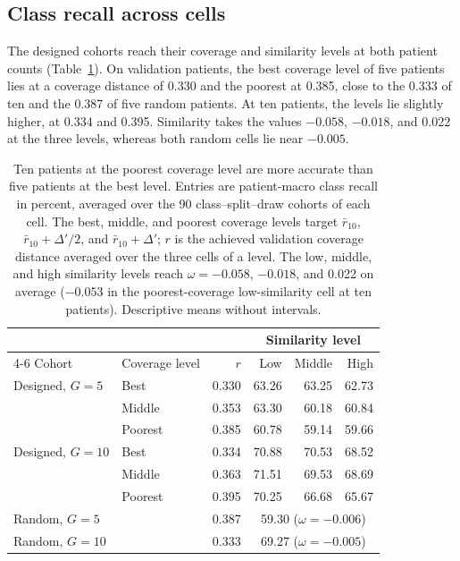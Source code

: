 \subsection{Class recall across cells}
\label{sec:cell-results}
The designed cohorts reach their coverage and similarity levels at both patient counts (Table~\ref{tab:cell-recall}). On validation patients, the best coverage level of five patients lies at a coverage distance of 0.330 and the poorest at 0.385, close to the 0.333 of ten and the 0.387 of five random patients. At ten patients, the levels lie slightly higher, at 0.334 and 0.395. Similarity takes the values $-0.058$, $-0.018$, and 0.022 at the three levels, whereas both random cells lie near $-0.005$.

\begin{table}[htbp]
\centering
\small
\renewcommand{\arraystretch}{1.15}
\begin{tabular}{@{}llrrrr@{}}
\toprule
 & & & \multicolumn{3}{c}{Similarity level} \\
\cmidrule(l){4-6}
Cohort & Coverage level & $r$ & Low & Middle & High \\
\midrule
Designed, $G=5$ & Best & 0.330 & 63.26 & 63.25 & 62.73 \\
 & Middle & 0.353 & 63.30 & 60.18 & 60.84 \\
 & Poorest & 0.385 & 60.78 & 59.14 & 59.66 \\
\addlinespace
Designed, $G=10$ & Best & 0.334 & 70.88 & 70.53 & 68.52 \\
 & Middle & 0.363 & 71.51 & 69.53 & 68.69 \\
 & Poorest & 0.395 & 70.25 & 66.68 & 65.67 \\
\midrule
Random, $G=5$ & & 0.387 & \multicolumn{3}{c}{59.30 ($\omega=-0.006$)} \\
Random, $G=10$ & & 0.333 & \multicolumn{3}{c}{69.27 ($\omega=-0.005$)} \\
\bottomrule
\end{tabular}
\caption{Ten patients at the poorest coverage level are more accurate than five patients at the best level. Entries are patient-macro class recall in percent, averaged over the 90 class--split--draw cohorts of each cell. The best, middle, and poorest coverage levels target $\bar r_{10}$, $\bar r_{10}+\Delta'/2$, and $\bar r_{10}+\Delta'$; $r$ is the achieved validation coverage distance averaged over the three cells of a level. The low, middle, and high similarity levels reach $\omega=-0.058$, $-0.018$, and 0.022 on average ($-0.053$ in the poorest-coverage low-similarity cell at ten patients). Descriptive means without intervals.}
\label{tab:cell-recall}
\end{table}

